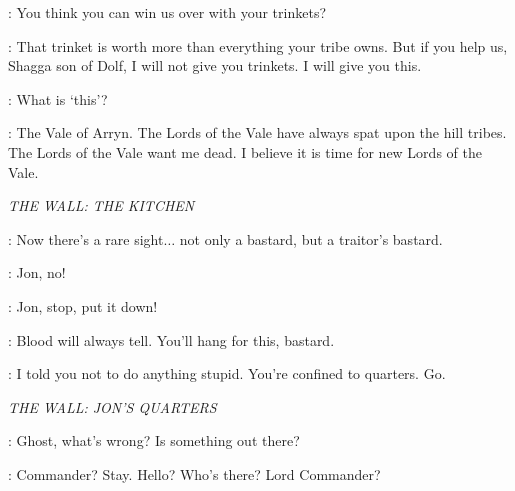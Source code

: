 
\SHAGGA: You think you can win us over with your trinkets? 


\TYRION: That trinket is worth more than everything your tribe owns. But if you help us, Shagga son of Dolf, I will not give you trinkets. I will give you this. 

\SHAGGA: What is `this'? 

\TYRION: The Vale of Arryn. The Lords of the Vale have always spat upon the hill tribes. The Lords of the Vale want me dead. I believe it is time for new Lords of the Vale. 


\scene

\textit{THE WALL: THE KITCHEN} 


\ALLISER: Now there's a rare sight$\ldots$ not only a bastard, but a traitor's bastard. 


\SAM: Jon, no! 

\PYP: Jon, stop, put it down! 

\ALLISER: Blood will always tell. You'll hang for this, bastard. 


\JEOR: I told you not to do anything stupid. You're confined to quarters. Go. 


\scene

\textit{THE WALL: JON'S QUARTERS} 


\JON: Ghost, what's wrong?  Is something out there? 


\JON: Commander?  Stay.  Hello? Who's there? Lord Commander? 


